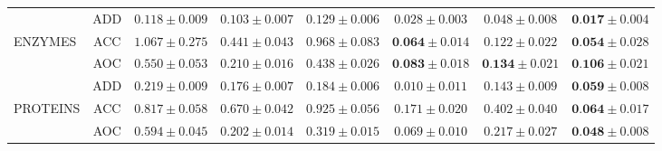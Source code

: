 \begin{table}
{\begin{tabular}{lccccccc}
         \midrule
          & ADD           & $0.118 \pm 0.009$ & $0.103 \pm 0.007$ & $0.129 \pm 0.006$ & $0.028 \pm 0.003$ & $0.048 \pm 0.008$          & $\textbf{0.017} \pm 0.004$\\
          ENZYMES & ACC   & $1.067 \pm 0.275$ & $0.441 \pm 0.043$ & $0.968 \pm 0.083$ & $\textbf{0.064} \pm 0.014$ & $0.122 \pm 0.022$          & $\textbf{0.054} \pm 0.028$\\
          & AOC           & $0.550 \pm 0.053$ & $0.210 \pm 0.016$ & $0.438 \pm 0.026$ & $\textbf{0.083} \pm 0.018$ & $\textbf{0.134} \pm 0.021$ & $\textbf{0.106} \pm 0.021$\\
         \midrule
          & ADD           & $0.219 \pm 0.009$ & $0.176 \pm 0.007$ & $0.184 \pm 0.006$ & $0.010 \pm 0.011$ & $0.143 \pm 0.009$          & $\textbf{0.059} \pm 0.008$\\
          PROTEINS & ACC  & $0.817 \pm 0.058$ & $0.670 \pm 0.042$ & $0.925 \pm 0.056$ & $0.171 \pm 0.020$ & $0.402 \pm 0.040$          & $\textbf{0.064} \pm 0.017$\\
          & AOC           & $0.594 \pm 0.045$ & $0.202 \pm 0.014$ & $0.319 \pm 0.015$ & $0.069 \pm 0.010$ & $0.217 \pm 0.027$          & $\textbf{0.048} \pm 0.008$\\
         \bottomrule

    \end{tabular}}
\end{table}